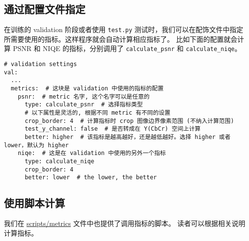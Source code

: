 \documentclass[../main.tex]{subfiles}
\begin{document}
\subsection{通过配置文件指定}

在训练的 validation 阶段或者使用 \texttt{test.py} 测试时，我们可以在配饰文件中指定所需要使用的指标。这样程序就会自动计算相应指标了。
比如下面的配置就会计算 PSNR 和 NIQE 的指标，分别调用了 \texttt{calculate_psnr} 和 \texttt{calculate_niqe}。

\begin{verbatim}
# validation settings
val:
  ...
  metrics:  # 这块是 validation 中使用的指标的配置
    psnr:  # metric 名字, 这个名字可以是任意的
      type: calculate_psnr  # 选择指标类型
      # 以下属性是灵活的, 根据不同 metric 有不同的设置
      crop_border: 4  # 计算指标时 crop 图像边界像素范围 (不纳入计算范围)
      test_y_channel: false  # 是否转成在 Y(CbCr) 空间上计算
      better: higher  # 该指标是越高越好，还是越低越好。选择 higher 或者 lower，默认为 higher
    niqe:  # 这是在 validation 中使用的另外一个指标
      type: calculate_niqe
      crop_border: 4
      better: lower  # the lower, the better
\end{verbatim}

\subsection{使用脚本计算}

我们在 \href{https://github.com/XPixelGroup/BasicSR/tree/master/scripts/metrics}{scripts/metrics} 文件中也提供了调用指标的脚本。
读者可以根据相关说明计算指标。
\end{document}

